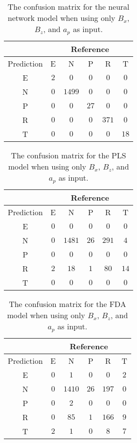 \begin{table}[!ht]
	\centering
	\begin{tabular}{|c|c|c|c|c|c|}
		\hline
		 & \multicolumn{5}{|c|}{Reference} \\ \hline
		 Prediction & E & N & P & R & T \\ \hline
		 E & $2$ & $0$ & $0$ & $0$ & $0$ \\ \hline
		 N & $0$ & $1499$ & $0$ & $0$ & $0$ \\ \hline
		 P & $0$ & $0$ & $27$ & $0$ & $0$ \\ \hline
		 R & $0$ & $0$ & $0$ & $371$ & $0$ \\ \hline
		 T & $0$ & $0$ & $0$ & $0$ & $18$ \\ \hline
	\end{tabular}
	\caption{The confusion matrix for the neural network model when using only $B_{x}$, $B_{z}$, and $a_{p}$ as input.}
	\label{tab:cm:xzap:nnet}
\end{table}

\begin{table}[!ht]
	\centering
	\begin{tabular}{|c|c|c|c|c|c|}
		\hline
		 & \multicolumn{5}{|c|}{Reference} \\ \hline
		 Prediction & E & N & P & R & T \\ \hline
		 E & $0$ & $0$ & $0$ & $0$ & $0$ \\ \hline
		 N & $0$ & $1481$ & $26$ & $291$ & $4$ \\ \hline
		 P & $0$ & $0$ & $0$ & $0$ & $0$ \\ \hline
		 R & $2$ & $18$ & $1$ & $80$ & $14$ \\ \hline
		 T & $0$ & $0$ & $0$ & $0$ & $0$ \\ \hline
	\end{tabular}
	\caption{The confusion matrix for the PLS model when using only $B_{x}$, $B_{z}$, and $a_{p}$ as input.}
	\label{tab:cm:xzap:pls}
\end{table}

\begin{table}[!ht]
	\centering
	\begin{tabular}{|c|c|c|c|c|c|}
		\hline
		 & \multicolumn{5}{|c|}{Reference} \\ \hline
		 Prediction & E & N & P & R & T \\ \hline
		 E & $0$ & $1$ & $0$ & $0$ & $2$ \\ \hline
		 N & $0$ & $1410$ & $26$ & $197$ & $0$ \\ \hline
		 P & $0$ & $2$ & $0$ & $0$ & $0$ \\ \hline
		 R & $0$ & $85$ & $1$ & $166$ & $9$ \\ \hline
		 T & $2$ & $1$ & $0$ & $8$ & $7$ \\ \hline
	\end{tabular}
	\caption{The confusion matrix for the FDA model when using only $B_{x}$, $B_{z}$, and $a_{p}$ as input.}
	\label{tab:cm:xzap:fda}
\end{table}

